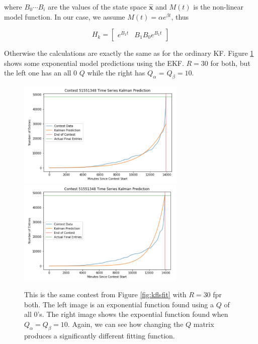 where $B_{0} \cdots B_{i}$ are the values of the state space $\bm{\hat{x}}$ and $M(t)$ is the non-linear model function. In our case, we assume $M(t) = \alpha e^{\beta t}$, thus

\begin{equation}
H_{k} = \begin{bmatrix}
           e^{B_{1}t}&B_{1}B_{0}e^{B_{1}t}
         \end{bmatrix}
\end{equation}

Otherwise the calculations are exactly the same as for the ordinary KF. Figure \ref{fig:ekfexamp} shows some exponential model predictions using the EKF. $R = 30$ for both, but the left one has an all 0 $Q$ while the right has $Q_{\alpha}$ = $Q_{\beta} = 10$.

\begin{figure}[h]
\centering
\includegraphics[width=8cm]{body/methodology/KF_True0.png}
\includegraphics[width=8cm]{body/methodology/KF_True10.png}
\caption{This is the same contest from Figure \ref{fig:kflsfit} with $R = 30$ fpr both. The left image is an exponential function found using a $Q$ of all 0's. The right image shows the expoential function found when $Q_{\alpha} = Q_{\beta} = 10$. Again, we can see how changing the $Q$ matrix produces a significantly different fitting function.}
\label{fig:ekfexamp}
\end{figure}
